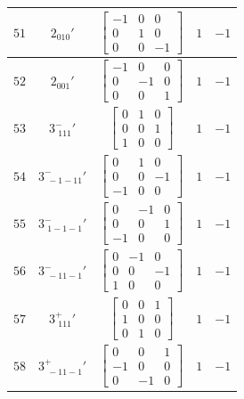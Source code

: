 \documentclass[fleqn,8pt]{jsarticle}
\begin{document}
\begin{longtable}{ccccc}
$ 51 $ & $ 2{}_{010}{}' $ & $ \begin{bmatrix} -1 & 0 & 0 \\ 0 & 1 & 0 \\ 0 & 0 & -1 \end{bmatrix} $ & $ 1 $ & $ -1 $ \\ \hline
$ 52 $ & $ 2{}_{001}{}' $ & $ \begin{bmatrix} -1 & 0 & 0 \\ 0 & -1 & 0 \\ 0 & 0 & 1 \end{bmatrix} $ & $ 1 $ & $ -1 $ \\ \hline
$ 53 $ & $ 3^{-}_{\,\,111}{}' $ & $ \begin{bmatrix} 0 & 1 & 0 \\ 0 & 0 & 1 \\ 1 & 0 & 0 \end{bmatrix} $ & $ 1 $ & $ -1 $ \\ \hline
$ 54 $ & $ 3^{-}_{\,\,-1-11}{}' $ & $ \begin{bmatrix} 0 & 1 & 0 \\ 0 & 0 & -1 \\ -1 & 0 & 0 \end{bmatrix} $ & $ 1 $ & $ -1 $ \\ \hline
$ 55 $ & $ 3^{-}_{\,\,1-1-1}{}' $ & $ \begin{bmatrix} 0 & -1 & 0 \\ 0 & 0 & 1 \\ -1 & 0 & 0 \end{bmatrix} $ & $ 1 $ & $ -1 $ \\ \hline
$ 56 $ & $ 3^{-}_{\,\,-11-1}{}' $ & $ \begin{bmatrix} 0 & -1 & 0 \\ 0 & 0 & -1 \\ 1 & 0 & 0 \end{bmatrix} $ & $ 1 $ & $ -1 $ \\ \hline
$ 57 $ & $ 3^{+}_{\,\,111}{}' $ & $ \begin{bmatrix} 0 & 0 & 1 \\ 1 & 0 & 0 \\ 0 & 1 & 0 \end{bmatrix} $ & $ 1 $ & $ -1 $ \\ \hline
$ 58 $ & $ 3^{+}_{\,\,-11-1}{}' $ & $ \begin{bmatrix} 0 & 0 & 1 \\ -1 & 0 & 0 \\ 0 & -1 & 0 \end{bmatrix} $ & $ 1 $ & $ -1 $ \\ \hline

\end{longtable}
\end{document}
